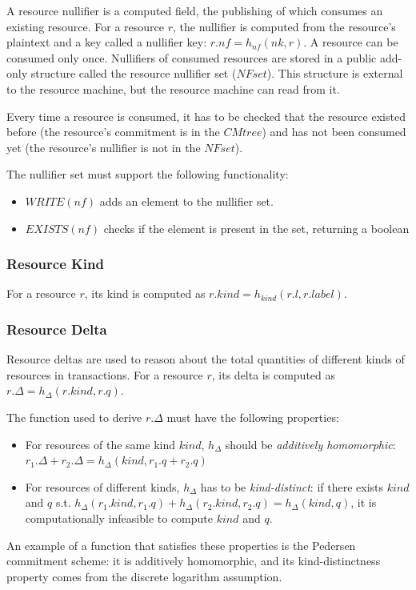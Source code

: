 \documentclass[
    11pt,            %
    techreport,        %
    affiltop,       %
]{art}
\begin{document}
A resource nullifier is a computed field, the publishing of which consumes an existing resource. For a resource $r$, the nullifier is computed from the resource's plaintext and a key called a nullifier key: $r.nf = h_{nf}(nk, r)$. A resource can be consumed only once. Nullifiers of consumed resources are stored in a public add-only structure called the resource nullifier set ($NFset$). This structure is external to the resource machine, but the resource machine can read from it.

Every time a resource is consumed, it has to be checked that the resource existed before (the resource's commitment is in the $CMtree$) and has not been consumed yet (the resource's nullifier is not in the $NFset$).

The nullifier set must support the following functionality:
\begin{itemize}
    \item $WRITE(nf)$ adds an element to the nullifier set. 
    \item $EXISTS(nf)$ checks if the element is present in the set, returning a boolean

\end{itemize}
\subsubsection{Resource Kind}
For a resource $r$, its kind is computed as $r.kind = h_{kind}(r.l, r.label)$.

\subsubsection{Resource Delta}\label{delta-resource}
Resource deltas are used to reason about the total quantities of different kinds of resources in transactions. For a resource $r$, its delta is computed as $r.\Delta = h_{\Delta}(r.kind, r.q)$.

\begin{remark}
    The function used to derive $r.\Delta$ must have the following properties:
    \begin{itemize}
    \item For resources of the same kind $kind$, $h_{\Delta}$ should be \textit{additively homomorphic}:
$r_1.\Delta + r_2.\Delta = h_{\Delta}(kind, r_1.q + r_2.q)$
    \item For resources of different kinds, $h_\Delta$ has to be \textit{kind-distinct}: if there exists $kind$ and $q$ s.t. $h_\Delta(r_1.kind, r_1.q) + h_\Delta(r_2.kind, r_2.q) = h_\Delta(kind, q)$, it is computationally infeasible to compute $kind$ and $q$.
\end{itemize}

An example of a function that satisfies these properties is the Pedersen commitment scheme: it is additively homomorphic, and its kind-distinctness property comes from the discrete logarithm assumption.
\end{remark}
\end{document}
